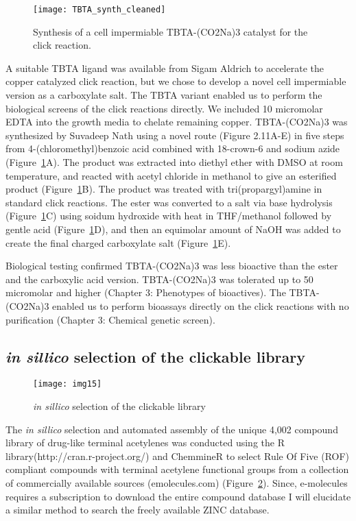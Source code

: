\begin{figure}
\centering
\texttt{[image: TBTA\_synth\_cleaned]}
\caption{Synthesis of a cell impermiable TBTA-(CO2Na)3 catalyst for the click reaction.}
\label{fig:TBTA}
\end{figure}


A suitable TBTA ligand \cite{chan2004polytriazoles} was available from Sigam Aldrich to accelerate the copper catalyzed click reaction, but we chose to develop a novel cell impermiable version as a carboxylate salt. The TBTA variant enabled us to perform the biological screens of the click reactions directly. We included 10 micromolar EDTA into the growth media to chelate remaining copper. TBTA-(CO2Na)3 was synthesized by Suvadeep Nath using a novel route (Figure 2.11A-E) in five steps from 4-(chloromethyl)benzoic acid combined with 18-crown-6 and sodium azide (Figure~\ref{fig:TBTA}A). The product was extracted into diethyl ether with DMSO at room temperature, and reacted with acetyl chloride in methanol to give an esterified product (Figure~\ref{fig:TBTA}B). The product was treated with tri(propargyl)amine in standard click reactions. The ester was converted to a salt via base hydrolysis (Figure~\ref{fig:TBTA}C) using soidum hydroxide with heat in THF/methanol followed by gentle acid (Figure~\ref{fig:TBTA}D), and then an equimolar amount of NaOH was added to create the final charged carboxylate salt (Figure~\ref{fig:TBTA}E).


Biological testing confirmed TBTA-(CO2Na)3 was less bioactive than the ester and the carboxylic acid version. TBTA-(CO2Na)3 was tolerated up to 50 micromolar and higher (Chapter 3: Phenotypes of bioactives). The TBTA-(CO2Na)3 enabled us to perform bioassays directly on the click reactions with no purification (Chapter 3: Chemical genetic screen).

\subsection{{\it in sillico} selection of the clickable library}

\begin{figure}
\centering
\texttt{[image: img15]}
\caption{{\it in sillico} selection of the clickable library}
\label{fig:InSillicoSelection}
\end{figure}

The {\it in sillico} selection and automated assembly of the unique 4,002 compound library of drug-like terminal acetylenes was conducted using the R library(http://cran.r-project.org/) and ChemmineR \cite{cao2008chemminer} to select Rule Of Five (ROF) \cite{lipinski2000drug} compliant compounds with terminal acetylene functional groups from a collection of commercially available sources (emolecules.com) (Figure~\ref{fig:InSillicoSelection}). Since, e-molecules requires a subscription to download the entire compound database I will elucidate a similar method to search the freely available ZINC database.

